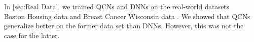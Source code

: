 In \cref{sec:Real Data}, we trained QCNs and DNNs on the real-world datasets Boston Housing data \cite{boston} and Breast Cancer Wisconsin data \cite{cancer}. We showed that QCNs generalize better on the former data set than DNNs. However, this was not the case for the latter.  






